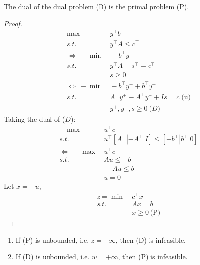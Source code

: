 \documentclass[11pt]{article}
\numberwithin{equation}{section}
\begin{document}
\begin{proposition}
    The dual of the dual problem (D) is the primal problem (P).
    \begin{proof}
        \begin{align*}
            \max&\ y^\top b \\
            s.t. & \ y^\top A\leq c^\top  \\
            \Longleftrightarrow \ -\min&\ -b^\top y \\
            s.t. & \ y^\top A + s^\top = c^\top \\
            & \  s \geq 0 \\
            \Longleftrightarrow \ -\min&\ -b^\top y^+ + b^\top y^- \\
            s.t. & \ A^\top y^+ - A^\top y^- + Is= c\; \text{(u)}\\
            & \  y^+,y^-,s \geq 0\;
            \text{(}\bar{D}\text{)}
        \end{align*}
        Taking the dual of ($\bar{D}$):
        \begin{align*}
            -\max&\ u^\top c \\
            s.t. & \ u^\top \left[A^\top |-A^\top |I\right] \leq \left[-b^\top |b^\top |0\right] \\
            \Longleftrightarrow \ -\max&\ u^\top c \\
            s.t. & \ Au \leq -b \\
            & \ -Au \leq b \\
            & \ u =0
        \end{align*}
        Let $x=-u$,
        \begin{align*}
            z=\min&\ c^\top x \\
            s.t.& \ Ax=b\\
            &\ x \geq 0\; \text{(P)}
        \end{align*}
    \end{proof}
\end{proposition}

\begin{corollary}
    \begin{enumerate}
        \item If (P) is unbounded, i.e. $z=-\infty$, then (D) is infeasible.
        \item If (D) is unbounded, i.e. $w=+\infty$, then (P) is infeasible.
    \end{enumerate}
\end{corollary}
\end{document}
